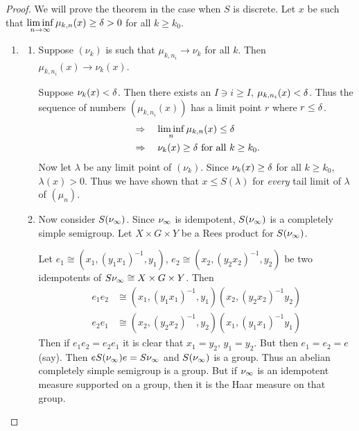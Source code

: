 \begin{proof} We will prove the theorem in the case when $S$ is
discrete.  
Let $x$ be such that $\liminf\limits_{n\to\infty} \mu_{k,n}(x) \ge \delta > 0$ for all $k \ge k_0$.
%
\begin{enumerate}  \item[]
\begin{enumerate}
\item[Step 1] Suppose $(\nu_k)$ is such that $\mu_{k,n_i} \to \nu_k$ for all $k$.  
Then $\mu_{k,n_i}(x) \to \nu_k(x)$.

Suppose $\nu_k(x) < \delta$.  
Then there exists an $I \ni i \ge I$, $\mu_{k,n_i}(x) < \delta$.  
Thus the sequence of numbers $(\mu_{k,n_i}(x))$ has a limit point $r$ where $r \le \delta$.
\[
\begin{aligned}
       &\Rightarrow \quad \liminf_n \mu_{k,n}(x) \le \delta   \\
       &\Rightarrow \quad \nu_k(x) \ge \delta \hbox{ for all }
               k \ge k_0.
\end{aligned}
\]
Now let $\lambda$ be any limit point of $(\nu_k)$.  Since
$\nu_k(x) \ge \delta$ for all $k \ge k_0$, $\lambda(x) > 0$.  Thus we have
shown that $x \le S(\lambda)$ for {\sl every} tail limit of $\lambda$ of
$(\mu_n)$.

\item[Step 2] Now consider $S(\nu_\infty)$.  
Since $\nu_\infty$ is idempotent, $S(\nu_\infty)$ is a completely simple semigroup.  
Let $X \times G \times Y$ be a Rees product for $S(\nu_\infty)$.

Let $e_1 \cong (x_1,(y_1x_1)^{-1},y_1)$, $e_2 \cong (x_2,(y_2x_2)^{-1},y_2)$ be two idempotents of $S\nu_\infty \cong X \times G \times Y$.  
Then
\[
\begin{aligned}
       e_1e_2 &\cong (x_1,(y_1x_1)^{-1},y_1)(x_2,(y_2x_2)^{-1}y_2) \\
       e_2e_1 &\cong (x_2,(y_2x_2)^{-1},y_2)(x_1,(y_1x_1)^{-1}y_1)
\end{aligned}
\]
Then if $e_1e_2 = e_2e_1$ it is clear that $x_1 = y_2$, $y_1 = y_2$.
But then $e_1 = e_2 = e$ (say).  
Then $eS(\nu_\infty)e = S\nu_\infty$ and $S(\nu_\infty)$ is a group.  
Thus an abelian completely simple semigroup is a group.  
But if $\nu_\infty$ is an idempotent measure supported on a group, then it is the Haar measure on that group.


\end{enumerate}
\end{enumerate}
\end{proof}
